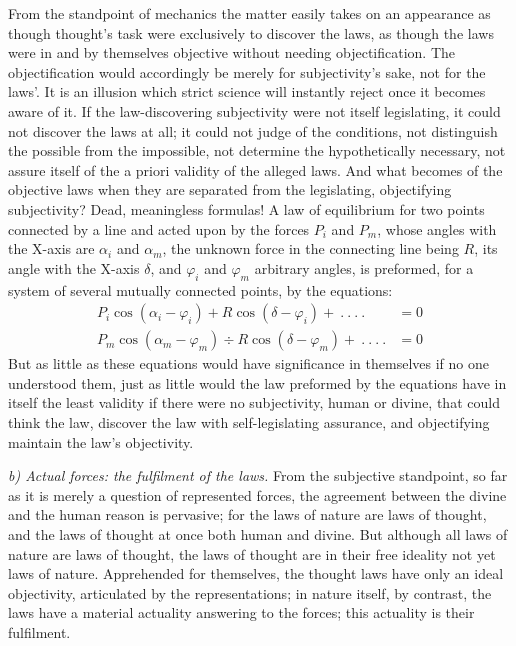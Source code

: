 \documentclass[12pt,a4paper]{book}
\newcommand{\runin}[1]{\emph{#1}\hspace{0.4em}}
\begin{document}
From the standpoint of mechanics the matter easily takes on an appearance as though
thought's task were exclusively to discover the laws, as though the laws were in and
by themselves objective without needing objectification. The objectification would
accordingly be merely for subjectivity's sake, not for the laws'. It is an illusion
which strict science will instantly reject once it becomes aware of it. If the
law-discovering subjectivity were not itself legislating, it
could not discover the laws at all; it could not judge of the conditions, not
distinguish the possible from the impossible, not determine the hypothetically
necessary, not assure itself of the a priori validity of the alleged laws. And what
becomes of the objective laws when they are separated from the legislating,
objectifying subjectivity? Dead, meaningless formulas! A law of equilibrium for two
points connected by a line and acted upon by the forces $P_i$ and $P_m$, whose angles
with the X-axis are $\alpha_i$ and $\alpha_m$, the unknown force in the connecting line
being $R$, its angle with the X-axis $\delta$, and $\varphi_i$ and $\varphi_m$
arbitrary angles, is preformed, for a system of several mutually connected points, by
the equations:
\begin{align*}
P_i \cos (\alpha_i - \varphi_i) + R \cos (\delta - \varphi_i) + \ .\ .\ .\ . &= 0\\
P_m \cos (\alpha_m - \varphi_m) \div R \cos (\delta - \varphi_m) + \ .\ .\ .\ . &= 0
\end{align*}
But as little as these equations would have significance in themselves if no one
understood them, just as little would the law preformed by the equations have in itself
the least validity if there were no subjectivity, human or divine, that could think the
law, discover the law with self-legislating assurance, and objectifying maintain the
law's objectivity.

\runin{b) Actual forces: the fulfilment of the laws.} From the subjective standpoint,
so far as it is merely a question of represented forces, the agreement between the
divine and the human reason is pervasive; for the laws of nature are laws of thought,
and the laws of thought at once both human and divine. But although all laws of nature
are laws of thought, the laws of thought are in their free ideality not yet laws of
nature. Apprehended for themselves, the thought laws have only an ideal objectivity,
articulated by the representations; in nature itself, by contrast, the laws have a
material actuality answering to the forces; this actuality is their fulfilment.
\end{document}
